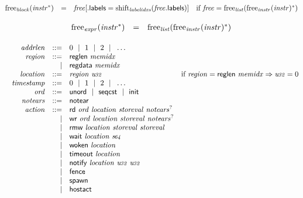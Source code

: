 $$
\begin{array}[t]{@{}lcl@{}l@{}}
{\mathrm{free}}_{\mathit{block}}({{\mathit{instr}}^\ast}) & = & {\mathit{free}}{}[{.}\mathsf{labels} = {\mathrm{shift}}_{\mathit{labelidxs}}({\mathit{free}}{.}\mathsf{labels})] & \quad \mbox{if}~ {\mathit{free}} = {\mathrm{free}}_{\mathit{list}}({{\mathrm{free}}_{\mathit{instr}}({\mathit{instr}})^\ast}) \\
\end{array}
$$

\vspace{1ex}

$$
\begin{array}[t]{@{}lcl@{}l@{}}
{\mathrm{free}}_{\mathit{expr}}({{\mathit{instr}}^\ast}) & = & {\mathrm{free}}_{\mathit{list}}({{\mathrm{free}}_{\mathit{instr}}({\mathit{instr}})^\ast}) \\
\end{array}
$$

$$
\begin{array}[t]{@{}lrrl@{}l@{}}
& {\mathit{addrlen}} & ::= & 0 ~~|~~ 1 ~~|~~ 2 ~~|~~ \dots \\
& {\mathit{region}} & ::= & \mathsf{reglen}~{\mathit{memidx}} \\
& & | & \mathsf{regdata}~{\mathit{memidx}} \\
& {\mathit{location}} & ::= & {\mathit{region}}~{\mathit{u{\kern-0.1em\scriptstyle 32}}} & \quad \mbox{if}~ {\mathit{region}} = \mathsf{reglen}~{\mathit{memidx}} \Rightarrow {\mathit{u{\kern-0.1em\scriptstyle 32}}} = 0 \\
& {\mathit{timestamp}} & ::= & 0 ~~|~~ 1 ~~|~~ 2 ~~|~~ \dots \\
& {\mathit{ord}} & ::= & \mathsf{unord} ~~|~~ \mathsf{seqcst} ~~|~~ \mathsf{init} \\
& {\mathit{notears}} & ::= & \mathsf{notear} \\
& {\mathit{action}} & ::= & \mathsf{rd}~{\mathit{ord}}~{\mathit{location}}~{\mathit{storeval}}~{{\mathit{notears}}^?} \\
& & | & \mathsf{wr}~{\mathit{ord}}~{\mathit{location}}~{\mathit{storeval}}~{{\mathit{notears}}^?} \\
& & | & \mathsf{rmw}~{\mathit{location}}~{\mathit{storeval}}~{\mathit{storeval}} \\
& & | & \mathsf{wait}~{\mathit{location}}~{\mathit{s{\kern-0.1em\scriptstyle 64}}} \\
& & | & \mathsf{woken}~{\mathit{location}} \\
& & | & \mathsf{timeout}~{\mathit{location}} \\
& & | & \mathsf{notify}~{\mathit{location}}~{\mathit{u{\kern-0.1em\scriptstyle 32}}}~{\mathit{u{\kern-0.1em\scriptstyle 32}}} \\
& & | & \mathsf{fence} \\
& & | & \mathsf{spawn} \\
& & | & \mathsf{hostact} \\
\end{array}
$$

